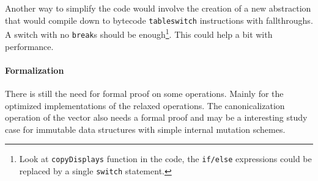 Another way to simplify the code would involve the creation of a new abstraction that would compile down to bytecode \texttt{tableswitch} instructions with fallthroughs. A switch with no \texttt{break}s should be enough\footnote{Look at \texttt{copyDisplays} function in the code, the \texttt{if/else} expressions could be replaced by a single \texttt{switch} statement.}. This could help a bit with performance.

\paragraph{Formalization}
There is still the need for formal proof on some operations. Mainly for the optimized implementations of the relaxed operations. The canonicalization operation of the vector also needs a formal proof and may be a interesting study case for immutable data structures with simple internal mutation schemes.


